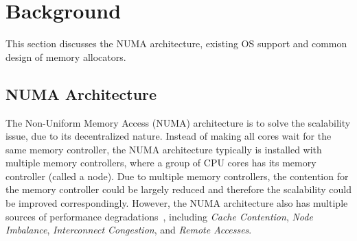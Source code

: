 \section{Background}
\label{sec:background}

This section discusses the NUMA architecture, existing OS support and common design of memory allocators.

\subsection{NUMA Architecture}

\label{sec:numa}


The Non-Uniform Memory Access (NUMA) architecture is to solve the scalability issue, due to its decentralized nature. Instead of making all cores wait for the same memory controller, the NUMA architecture typically is installed with multiple memory controllers, where a group of CPU cores has its memory controller (called a node). Due to multiple memory controllers, the contention for the memory controller could be largely reduced and therefore the scalability could be improved correspondingly. However, the NUMA architecture also has multiple sources of performance degradations~\cite{Blagodurov:2011:CNC:2002181.2002182}, including \textit{Cache Contention}, \textit{Node Imbalance}, \textit{Interconnect Congestion}, and \textit{Remote Accesses}.  

 

